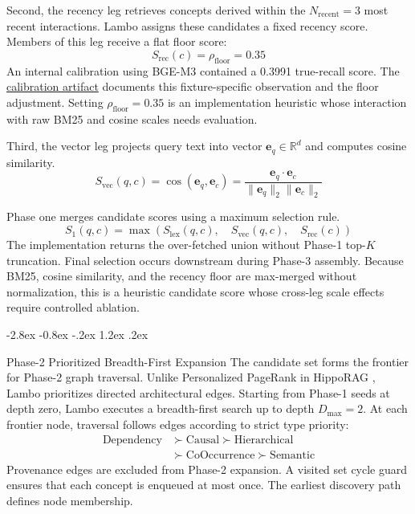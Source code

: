 \documentclass[10pt,twocolumn]{article}
\makeatletter
\renewcommand\subsection{\@startsection{subsection}{2}{\z@}%
  {-2.8ex \@plus -0.8ex \@minus -.2ex}%
  {1.2ex \@plus .2ex}%
  {\normalfont\normalsize\bfseries\raggedright}}
\makeatother
\begin{document}
Second, the recency leg retrieves concepts derived within the $N_{\text{recent}} = 3$ most recent interactions.
Lambo assigns these candidates a fixed recency score.
Members of this leg receive a flat floor score:
\begin{equation}
S_{\text{rec}}(c) = \rho_{\text{floor}} = 0.35
\end{equation}
An internal calibration using BGE-M3 \cite{chen2024bge} contained a 0.3991 true-recall score.
The \href{https://github.com/nrynss/lambo/tree/e11fb06ba61a480c8400d89ad6e40bbc39fc46c0/evidence/mooshik-g-recall-calibration}{calibration artifact} documents this fixture-specific observation and the floor adjustment.
Setting $\rho_{\text{floor}} = 0.35$ is an implementation heuristic whose interaction with raw BM25 and cosine scales needs evaluation.

Third, the vector leg projects query text into vector $\mathbf{e}_q \in \mathbb{R}^d$ and computes cosine similarity.
\begin{equation}
S_{\text{vec}}(q, c) = \cos(\mathbf{e}_q, \mathbf{e}_c) = \frac{\mathbf{e}_q \cdot \mathbf{e}_c}{\|\mathbf{e}_q\|_2 \|\mathbf{e}_c\|_2}
\end{equation}

Phase one merges candidate scores using a maximum selection rule.
\begin{equation}
S_1(q, c) = \max\left( S_{\text{lex}}(q, c), \quad S_{\text{vec}}(q, c), \quad S_{\text{rec}}(c) \right)
\end{equation}
The implementation returns the over-fetched union without Phase-1 top-$K$ truncation. Final selection occurs downstream during Phase-3 assembly. Because BM25, cosine similarity, and the recency floor are max-merged without normalization, this is a heuristic candidate score whose cross-leg scale effects require controlled ablation.

\subsection{Phase-2 Prioritized Breadth-First Expansion}
The candidate set forms the frontier for Phase-2 graph traversal.
Unlike Personalized PageRank in HippoRAG \cite{gutierrez2024hipporag, gutierrez2025hipporag2}, Lambo prioritizes directed architectural edges.
Starting from Phase-1 seeds at depth zero, Lambo executes a breadth-first search up to depth $D_{\max} = 2$.
At each frontier node, traversal follows edges according to strict type priority:
\begin{align}
\text{Dependency} &\succ \text{Causal} \succ \text{Hierarchical} \nonumber \\
                  &\succ \text{CoOccurrence} \succ \text{Semantic}
\end{align}
Provenance edges are excluded from Phase-2 expansion.
A visited set cycle guard ensures that each concept is enqueued at most once.
The earliest discovery path defines node membership.
\end{document}

